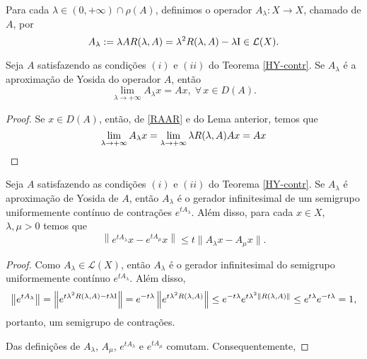 \begin{definition}
Para cada $\lambda \in (0,+\infty) \cap \rho(A)$, definimos o operador $A_\lambda: X\longrightarrow X$, chamado  de $A$, por 
\begin{equation*}
A_\lambda :=\lambda AR(\lambda,A) =\lambda^2R(\lambda,A) -\lambda \operatorname{\!I}\in \mathcal{L}(X).
\end{equation*}
\end{definition}

\begin{lemma}
 Seja $A$ satisfazendo as condições $(i)$ e $(ii)$ do Teorema \ref{HY-contr}. 
Se $A_\lambda$ é a aproximação de Yosida do operador $A$, então
\begin{equation*}
\lim_{\lambda \to +\infty}A_\lambda x=Ax,\; \forall\, x\in D(A).
\end{equation*}
\end{lemma}
\begin{proof}
Se $x\in D(A)$, então, de \eqref{RAAR} e do Lema anterior, temos que
\begin{equation*}
\lim_{\lambda \to +\infty}A_\lambda x=\lim_{\lambda \to +\infty}\lambda R(\lambda,A) Ax=Ax
\end{equation*}
\end{proof}

\begin{lemma}
Seja $A$ satisfazendo as condições $(i)$ e $(ii)$ do Teorema \ref{HY-contr}. Se $A_\lambda$ é  aproximação de Yosida de $A$, então $A_\lambda$ é o gerador infinitesimal de um semigrupo uniformemente contínuo de contrações $e^{tA_\lambda}$. Além disso, para cada $x\in X$, $\lambda,\mu>0$ temos que
\begin{equation*}
\left\|e^{tA_\lambda}x-e^{tA_\mu}x\right\|\leq t\|A_\lambda x-A_\mu x\|.
\end{equation*}
\end{lemma}
\begin{proof}
Como $A_\lambda \in \mathcal{L}(X)$, então $A_\lambda$ é o gerador infinitesimal do semigrupo uniformemente contínuo $e^{tA_\lambda}$. Além disso,
\begin{equation*}
\left\|e^{tA_\lambda}\right\|=\left\|e^{t\lambda^2R(\lambda,A)-t\lambda \operatorname{\!I}}\right\|
=e^{-t\lambda }\left\|e^{t\lambda^2R(\lambda,A)}\right\|
\leq e^{-t\lambda }e^{t\lambda^2\left\|R(\lambda,A)\right\|}
\leq e^{t\lambda }e^{-t\lambda }=1,
\end{equation*}
portanto, um semigrupo de contrações.

Das definições de $A_\lambda$, $A_\mu$, $e^{tA_\lambda}$ e $e^{tA_\mu}$ comutam. Consequentemente,
\end{proof}










